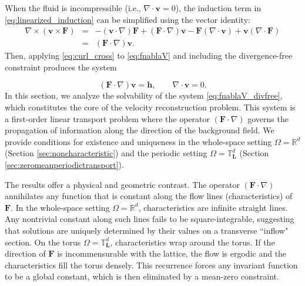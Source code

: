 \documentclass[12pt]{article}
\begin{document}
When the fluid is
		incompressible (i.e., $\nabla \cdot \boldsymbol{v} = 0$), the induction term in \eqref{eq:linearized_induction} can be simplified using the vector
		identity:  {{}
		\begin{eqnarray}
			\label{idendity}
			 \nabla \times ( \boldsymbol{v}\times \mathbf{F}) &=& -(\boldsymbol{v}
			\cdot \nabla) \mathbf{F} + (\mathbf{F} \cdot \nabla) \boldsymbol{v}
			- \mathbf{F} (\nabla \cdot \boldsymbol{v}) + \boldsymbol{v} (\nabla
			\cdot \mathbf{F})   \nonumber\\
			&=& (\mathbf{F} \cdot \nabla) \boldsymbol{v}\label{eq:curl_cross}.  
		\end{eqnarray}}
Then, applying \eqref{eq:curl_cross} to \eqref{eq:fnablaV} and including the divergence-free constraint produces the system

\begin{equation}
 {{} (\mathbf{F}\cdot \nabla) \boldsymbol{v} = \boldsymbol{h}, \qquad \nabla\cdot \boldsymbol{v}=0.}\label{eq:fnablaV_divfree}    
\end{equation}
In this section, we analyze the solvability of the system \eqref{eq:fnablaV_divfree}, which constitutes the core of the velocity reconstruction problem. This system is a first-order linear transport problem where the operator $(\mathbf{F} \cdot \nabla)$ governs the propagation of information along the direction of the background field. We provide conditions for existence and uniqueness in the whole-space setting $\Omega = \mathbb{R}^d$ (Section \ref{sec:noncharacteristic}) and the periodic setting $\Omega = \mathbb{T}^d_{\boldsymbol{L}}$ (Section \ref{sec:zeromeanperiodictransport}).


The results offer a physical and geometric contrast. The operator $(\mathbf{F} \cdot \nabla)$ annihilates any function that is constant along the flow lines (characteristics) of $\mathbf{F}$. In the whole-space setting $\Omega=\mathbb{R}^d$, characteristics are infinite straight lines. Any nontrivial constant along such lines fails to be square-integrable, suggesting that solutions are uniquely determined by their values on a transverse ``inflow" section. On the torus $\Omega=\mathbb{T}^d_{\boldsymbol{L}}$, characteristics wrap around the torus. If the direction of $\mathbf{F}$ is incommensurable with the lattice, the flow is ergodic and the characteristics fill the torus densely. This recurrence forces any invariant function to be a global constant, which is then eliminated by a mean-zero constraint.
\end{document}
